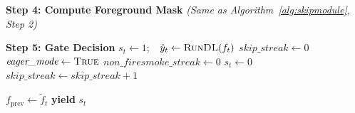 \begin{algorithm}[ht]
\begin{algorithmic}[1]
    \Statex \hspace{1.5em} \textbf{Step 4: Compute Foreground Mask}
    \State \textit{(Same as Algorithm~\ref{alg:skipmodule}, Step 2)}

    \Statex \hspace{1.5em} \textbf{Step 5: Gate Decision}
        \State $s_t \leftarrow 1$;\ \ $\hat{y}_t \leftarrow \textsc{RunDL}(f_t)$
        \State $\textit{skip\_streak} \leftarrow 0$
            \State $\textit{eager\_mode} \leftarrow \textsc{True}$  
            \State $\textit{non\_firesmoke\_streak} \leftarrow 0$
        \EndIf
    \Else
        \State $s_t \leftarrow 0$  
        \State $\textit{skip\_streak} \leftarrow \textit{skip\_streak} + 1$
    \EndIf

    \State $f_{\text{prev}} \leftarrow \tilde{f}_t$
    \State \textbf{yield} $s_t$

\EndFor

\end{algorithmic}
\end{algorithm}